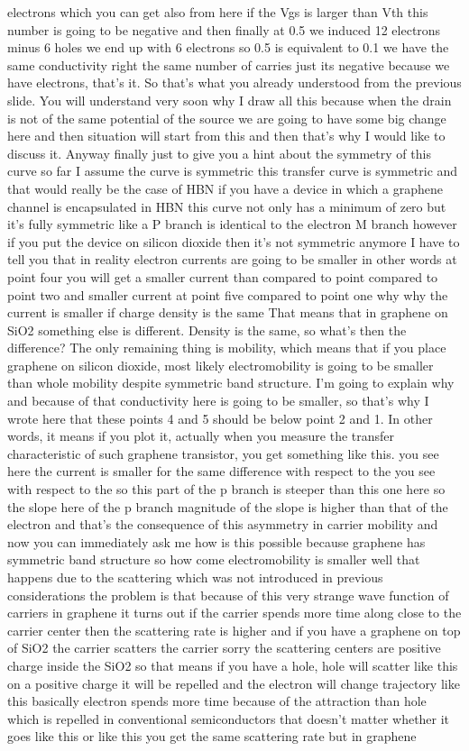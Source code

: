 electrons which you can get also from here if the Vgs is larger than Vth this number is going to be negative and then finally at 0.5 we induced 12 electrons minus 6 holes we end up with 6 electrons so 0.5 is equivalent to 0.1 we have the same conductivity right the same number of carries just its negative because we have electrons, that's it. So that's what you already understood from the previous slide. You will understand very soon why I draw all this because when the drain is not of the same potential of the source we are going to have some big change here and then situation will start from this and then that's why I would like to discuss it. Anyway finally just to give you a hint about the symmetry of this curve so far I assume the curve is symmetric this transfer curve is symmetric and that would really be the case of HBN if you have a device in which a graphene channel is encapsulated in HBN this curve not only has a minimum of zero but it's fully symmetric like a P branch is identical to the electron M branch however if you put the device on silicon dioxide then it's not symmetric anymore I have to tell you that in reality electron currents are going to be smaller in other words at point four you will get a smaller current than compared to point compared to point two and smaller current at point five compared to point one why why the current is smaller if charge density is the same That means that in graphene on SiO2 something else is different. Density is the same, so what's then the difference? The only remaining thing is mobility, which means that if you place graphene on silicon dioxide, most likely electromobility is going to be smaller than whole mobility despite symmetric band structure. I'm going to explain why and because of that conductivity here is going to be smaller, so that's why I wrote here that these points 4 and 5 should be below point 2 and 1. In other words, it means if you plot it, actually when you measure the transfer characteristic of such graphene transistor, you get something like this. you see here the current is smaller for the same difference with respect to the you see with respect to the so this part of the p branch is steeper than this one here so the slope here of the p branch magnitude of the slope is higher than that of the electron and that's the consequence of this asymmetry in carrier mobility and now you can immediately ask me how is this possible because graphene has symmetric band structure so how come electromobility is smaller well that happens due to the scattering which was not introduced in previous considerations the problem is that because of this very strange wave function of carriers in graphene it turns out if the carrier spends more time along close to the carrier center then the scattering rate is higher and if you have a graphene on top of SiO2 the carrier scatters the carrier sorry the scattering centers are positive charge inside the SiO2 so that means if you have a hole, hole will scatter like this on a positive charge it will be repelled and the electron will change trajectory like this basically electron spends more time because of the attraction than hole which is repelled in conventional semiconductors that doesn't matter whether it goes like this or like this you get the same scattering rate but in graphene 